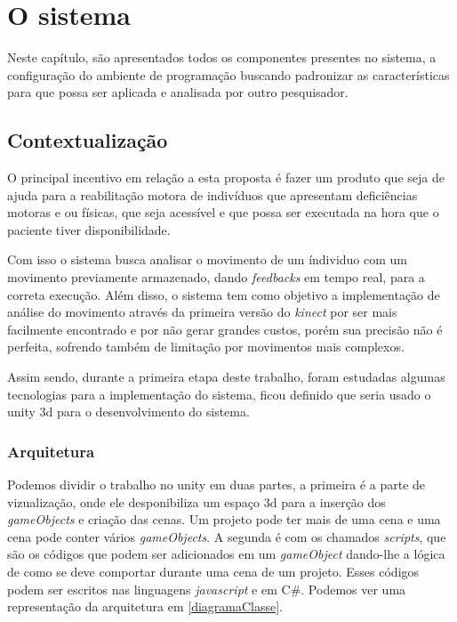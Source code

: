 \chapter[O sistema]{O sistema}
Neste capítulo, são apresentados todos os componentes presentes no sistema,
 a configuração do ambiente de programação buscando padronizar as características para que possa ser aplicada e analisada por outro pesquisador.

\section{Contextualização}
  O principal incentivo em relação a esta proposta é fazer um produto que seja de ajuda
para a reabilitação motora  de indivíduos que apresentam deficiências motoras e ou físicas, que seja acessível e
que possa ser executada na hora que o paciente tiver disponibilidade.

  Com isso o sistema busca analisar o movimento de um índividuo com um movimento previamente
armazenado, dando \textit{feedbacks} em tempo real, para a correta execução. Além disso,
o sistema tem como objetivo a implementação de análise do movimento através da primeira
versão do \textit{kinect} por ser mais facilmente encontrado e por não gerar grandes custos, porém
sua precisão não é perfeita, sofrendo também de limitação por movimentos mais complexos.

Assim sendo, durante a primeira etapa deste trabalho,  foram estudadas algumas tecnologias para a implementação do sistema,
 ficou definido que seria usado o unity 3d para o desenvolvimento do sistema.

\subsection{Arquitetura}\label{sub:arquitetura}
  Podemos dividir o trabalho no unity em duas partes,
a primeira é a parte de vizualização, onde ele desponibiliza um espaço 3d para a inserção dos \textit{gameObjects} e criação das cenas. Um projeto pode
ter mais de uma cena e uma cena pode conter vários \textit{gameObjects}. A segunda é com os chamados \textit{scripts}, que são os códigos que podem
ser adicionados em um \textit{gameObject} dando-lhe a lógica de como se deve comportar durante uma cena de um projeto. Esses códigos podem ser escritos
nas linguagens \textit{javascript} e em C\#. Podemos ver uma representação da arquitetura em \ref{diagramaClasse}.


